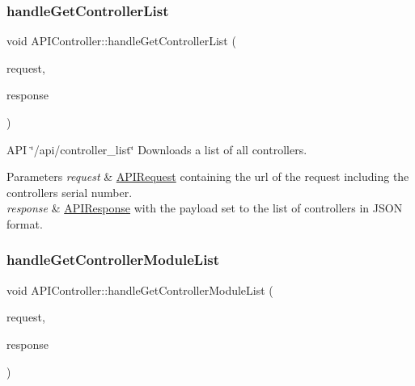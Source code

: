 \subsubsection{\texorpdfstring{handle\+Get\+Controller\+List}{handleGetControllerList}}
{\footnotesize\ttfamily void A\+P\+I\+Controller\+::handle\+Get\+Controller\+List (\begin{DoxyParamCaption}\item[{const \hyperlink{class_a_p_i_request}{A\+P\+I\+Request} \&}]{request,  }\item[{\hyperlink{class_a_p_i_response}{A\+P\+I\+Response} $\ast$}]{response }\end{DoxyParamCaption})\hspace{0.3cm}{\ttfamily [slot]}}

A\+PI \char`\"{}/api/controller\+\_\+list\char`\"{} Downloads a list of all controllers. 
\begin{DoxyParams}{Parameters}
{\em request} & \hyperlink{class_a_p_i_request}{A\+P\+I\+Request} containing the url of the request including the controller\textquotesingle{}s serial number. \\
\hline
{\em response} & \hyperlink{class_a_p_i_response}{A\+P\+I\+Response} with the payload set to the list of controllers in J\+S\+ON format. \\
\hline
\end{DoxyParams}
\mbox{\label{class_a_p_i_controller_a20ce823aeb786d2af26fde41c2dc74a1}} 
\subsubsection{\texorpdfstring{handle\+Get\+Controller\+Module\+List}{handleGetControllerModuleList}}
{\footnotesize\ttfamily void A\+P\+I\+Controller\+::handle\+Get\+Controller\+Module\+List (\begin{DoxyParamCaption}\item[{const \hyperlink{class_a_p_i_request}{A\+P\+I\+Request} \&}]{request,  }\item[{\hyperlink{class_a_p_i_response}{A\+P\+I\+Response} $\ast$}]{response }\end{DoxyParamCaption})\hspace{0.3cm}{\ttfamily [slot]}}


